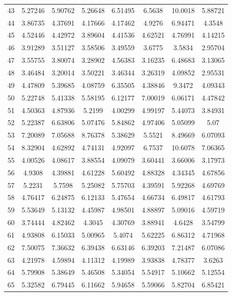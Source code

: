 \begin{center}
\begin{longtable}{cccccccc}
43 & 5.27246 & 5.90762 & 5.26648 & 6.51495 & 6.5638 & 10.0018 & 5.88721\\
44 & 3.86735 & 4.37691 & 4.17666 & 4.17462 & 4.9276 & 6.94471 & 4.3548\\
45 & 4.52446 & 4.42972 & 3.89604 & 4.41536 & 4.62521 & 4.76991 & 4.14215\\
46 & 3.91289 & 3.51127 & 3.58506 & 3.49559 & 3.6775 & 3.5834 & 2.95704\\
47 & 3.55755 & 3.80074 & 3.28902 & 4.56383 & 3.16235 & 6.48683 & 3.13065\\
48 & 3.46484 & 3.20014 & 3.50221 & 3.46344 & 3.26319 & 4.09852 & 2.95531\\
49 & 4.47809 & 5.39685 & 4.08759 & 6.35505 & 4.38846 & 9.3472 & 4.09343\\
50 & 5.22748 & 5.41338 & 5.58195 & 6.12177 & 7.00019 & 6.06171 & 4.47842\\
51 & 4.50363 & 4.87936 & 5.2199 & 4.00299 & 4.99197 & 5.44073 & 3.84931\\
52 & 5.22387 & 6.63806 & 5.07476 & 5.84862 & 4.97406 & 5.05099 & 5.07\\
53 & 7.20089 & 7.05688 & 8.76378 & 5.38629 & 5.5521 & 8.49669 & 6.07093\\
54 & 8.32904 & 4.62892 & 4.74131 & 4.92097 & 6.7537 & 10.6078 & 7.06365\\
55 & 4.00526 & 4.08617 & 3.88554 & 4.09079 & 3.60441 & 3.66006 & 3.17973\\
56 & 4.9308 & 4.39881 & 4.61228 & 5.60492 & 4.88328 & 4.34345 & 4.67856\\
57 & 5.2231 & 5.7598 & 5.25082 & 5.75703 & 4.39591 & 5.92268 & 4.69769\\
58 & 4.76417 & 6.24875 & 6.12133 & 5.47654 & 4.66734 & 6.49817 & 4.61793\\
59 & 5.53649 & 5.13132 & 4.45987 & 4.98501 & 4.88897 & 5.09016 & 4.59719\\
60 & 3.74444 & 4.82462 & 4.3045 & 4.30769 & 3.88941 & 4.6428 & 3.54799\\
61 & 4.93808 & 6.15033 & 5.00965 & 5.4074 & 5.62225 & 6.86312 & 4.71968\\
62 & 7.50075 & 7.36632 & 6.39438 & 6.63146 & 6.39203 & 7.21487 & 6.07086\\
63 & 4.21978 & 4.59894 & 4.11312 & 4.19989 & 3.93838 & 4.78377 & 3.6263\\
64 & 5.79908 & 5.38649 & 5.46508 & 5.34054 & 5.54917 & 5.10662 & 5.12554\\
65 & 5.32582 & 6.79445 & 6.11662 & 5.94658 & 5.59066 & 5.82704 & 6.85421\\

\end{longtable}
\end{center}
